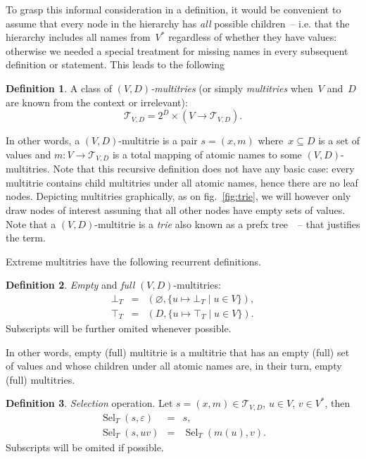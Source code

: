 \documentclass{article}
\theoremstyle{definition}
\newtheorem{Df}{Definition}
\newcommand{\setcharmt}{T}
\newcommand{\setsymbol}[3]{\mathcal{#1}_{#2,#3}}
\newcommand{\setmt}[2]{\setsymbol{\setcharmt}{#1}{#2}}
\newcommand{\select}{\operatorname{Sel}}
\begin{document}
To grasp this informal consideration in a definition, it would be convenient to
assume that every node in the hierarchy has \emph{all} possible children~-- i.e.
that the hierarchy includes all names from~$V^\ast$ regardless of whether they
have values: otherwise we needed a special treatment for missing names in
every subsequent definition or statement. This leads to the following

\begin{Df}\label{df:mt}
A class of \emph{$(V,D)$-multitries} (or simply \emph{multitries} when~$V$
and~$D$ are known from the context or irrelevant):
\[
  \setmt{V}{D} = 2^D \times (V \to \setmt{V}{D}) .
\]
\end{Df}

In other words, a $(V,D)$-multitrie is a pair $s = (x, m)$ where~$x\subseteq D$
is a set of values and $m: V \to \setmt{V}{D}$ is a total mapping of
atomic names to some $(V,D)$-multitries. Note that this recursive definition does
not have any basic case: every multitrie contains child multitries
under all atomic names, hence there are no leaf nodes.
Depicting multitries graphically, as on fig.~\ref{fig:trie}, we will however
only draw nodes of interest assuning that all other nodes have empty sets of
values.  Note that a $(V,D)$-multitrie is a \emph{trie} also known as
a prefx tree~\cite{bib:knuth-trie}~-- that justifies the term.

Extreme multitries have the following recurrent definitions.
\begin{Df}\label{df:mt-extreme}
\emph{Empty} and \emph{full} $(V,D)$-multitries:
\begin{eqnarray*}
  \bot_\setcharmt & = &
      ( \varnothing, \{ u \mapsto \bot_\setcharmt \mid u\in V \} ) , \\
  \top_\setcharmt & = &
      ( D,           \{ u \mapsto \top_\setcharmt \mid u\in V \} ) .
\end{eqnarray*}
Subscripts will be further omited whenever possible.
\end{Df}
In other words, empty (full) multitrie is a multitrie that has an empty
(full) set of values and whose children under all atomic names are, in their
turn, empty (full) multitries.

\begin{Df}\label{df:mt-select}
\emph{Selection} operation. Let $s=(x,m) \in \setmt{V}{D}$, $u\in V$,
$v\in V^\ast$, then
\begin{eqnarray*}
  \select_\setcharmt(s, \varepsilon) & = & s , \\
  \select_\setcharmt(s, u v) & = & \select_\setcharmt(m(u), v) .
\end{eqnarray*}
Subscripts will be omited if possible.
\end{Df}
\end{document}
